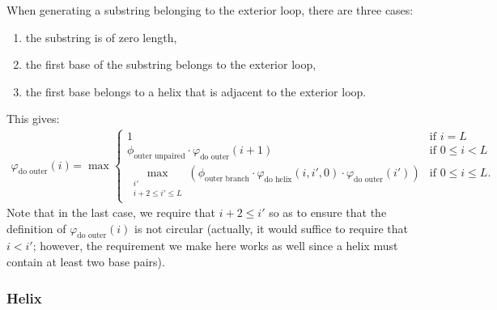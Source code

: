 \documentclass{article}
\newcommand{\doouter}{\varphi_\text{do outer}}
\newcommand{\outerunpaired}{\phi_\text{outer unpaired}}
\newcommand{\outerbranch}{\phi_\text{outer branch}}
\newcommand{\dohelix}{\varphi_\text{do helix}}
\begin{document}
  When generating a substring belonging to the exterior loop, there are three cases:
  \begin{enumerate}
  \item the substring is of zero length,
  \item the first base of the substring belongs to the exterior loop,
  \item the first base belongs to a helix that is adjacent to the exterior loop.
  \end{enumerate}
  This gives:
  \begin{align*}
    \doouter(i) &= \max \begin{cases}
      1 & \text{if $i=L$} \\
      \outerunpaired \cdot \doouter(i+1) & \text{if $0 \le i < L$} \\
      \displaystyle \max_{\substack{i' \\ i+2 \le i' \le L}} \left(\outerbranch \cdot \dohelix(i,i',0) \cdot \doouter(i')\right)
      & \text{if $0 \le i \le L$}.
    \end{cases}
  \end{align*}
  Note that in the last case, we require that $i+2 \le i'$ so as to ensure that
  the definition of $\doouter(i)$ is not circular (actually, it would suffice to
  require that $i < i'$; however, the requirement we make here works as well since
  a helix must contain at least two base pairs).

  \subsubsection{Helix}
\end{document}
